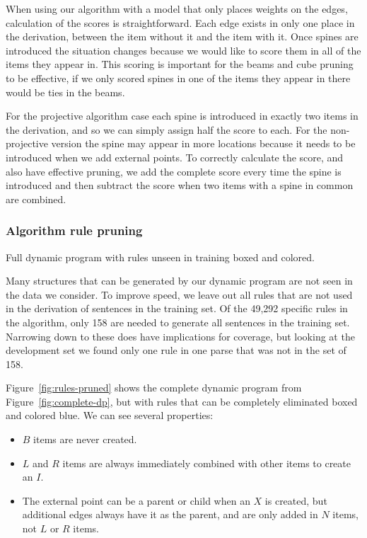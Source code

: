 When using our algorithm with a model that only places weights on the edges, calculation of the scores is straightforward.
Each edge exists in only one place in the derivation, between the item without it and the item with it.
Once spines are introduced the situation changes because we would like to score them in all of the items they appear in.
This scoring is important for the beams and cube pruning to be effective, if we only scored spines in one of the items they appear in there would be ties in the beams.

For the projective algorithm case each spine is introduced in exactly two items in the derivation, and so we can simply assign half the score to each.
For the non-projective version the spine may appear in more locations because it needs to be introduced when we add external points.
To correctly calculate the score, and also have effective pruning, we add the complete score every time the spine is introduced and then subtract the score when two items with a spine in common are combined.

\subsubsection{Algorithm rule pruning}

\begin{algorithm}
\vspace{-2mm}

\vspace{-10mm}
\caption{\label{fig:rules-pruned}
Full dynamic program with rules unseen in training boxed and colored.
}
\end{algorithm}

Many structures that can be generated by our dynamic program are not seen in the data we consider.
To improve speed, we leave out all rules that are not used in the derivation of sentences in the training set.
Of the 49,292 specific rules in the algorithm, only 158 are needed to generate all sentences in the training set.
Narrowing down to these does have implications for coverage, but looking at the development set we found only one rule in one parse that was not in the set of 158.

Figure~\ref{fig:rules-pruned} shows the complete dynamic program from Figure~\ref{fig:complete-dp}, but with rules that can be completely eliminated boxed and colored blue.
We can see several properties:

\begin{itemize}
  \item $B$ items are never created.
  \item $L$ and $R$ items are always immediately combined with other items to create an $I$.
  \item The external point can be a parent or child when an $X$ is created, but additional edges always have it as the parent, and are only added in $N$ items, not $L$ or $R$ items.
\end{itemize}

